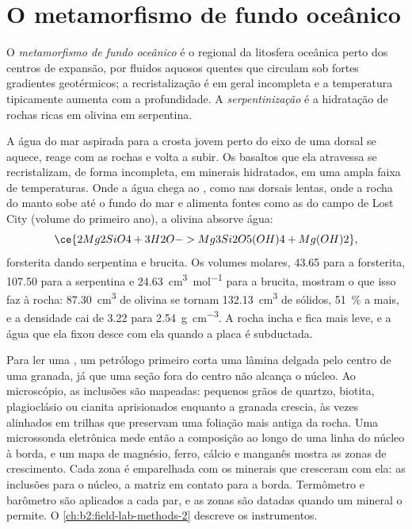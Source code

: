 \section{O metamorfismo de fundo oceânico}\label{sec:b2:pt-paths:ocean-floor}

\begin{definition}\label{def:b2:pt-paths:ocean-floor}
O \emph{metamorfismo de fundo oceânico} é o
 regional da litosfera oceânica perto dos centros de expansão, por fluidos aquosos quentes
que circulam sob fortes gradientes geotérmicos; a recristalização é em geral incompleta
e a temperatura tipicamente aumenta com a profundidade. A \emph{serpentinização}
é a hidratação de rochas ricas em olivina em serpentina.
\end{definition}

A água do mar aspirada para a crosta jovem perto do eixo de uma dorsal se aquece, reage com as rochas e
volta a subir. Os basaltos que ela atravessa se recristalizam, de forma incompleta, em minerais
hidratados, em uma ampla faixa de temperaturas. Onde a água chega ao , como nas
dorsais lentas, onde a rocha do manto sobe até o fundo do mar e alimenta fontes como
as do campo de Lost City (volume do primeiro ano), a olivina absorve água:
\[
\ce{2 Mg2SiO4 + 3 H2O -> Mg3Si2O5(OH)4 + Mg(OH)2},
\]
forsterita dando serpentina e brucita. Os volumes molares, 43.65 para a forsterita, 107.50
para a serpentina e \qty{24.63}{cm^3.mol^{-1}} para a brucita, mostram o que isso faz à rocha:
\qty{87.30}{cm^3} de olivina se tornam \qty{132.13}{cm^3} de sólidos, \qty{51}{\percent}
a mais, e a densidade cai de 3.22 para \qty{2.54}{g.cm^{-3}}. A rocha incha e
fica mais leve, e a água que ela fixou desce com ela quando a placa é subductada.

\begin{inthelab}
Para ler uma , um petrólogo primeiro corta uma lâmina delgada pelo centro de uma
granada, já que uma seção fora do centro não alcança o núcleo. Ao microscópio, as inclusões
são mapeadas: pequenos grãos de quartzo, biotita, plagioclásio ou cianita aprisionados enquanto a granada
crescia, às vezes alinhados em trilhas que preservam uma foliação mais antiga da rocha. Uma microssonda
eletrônica mede então a composição ao longo de uma linha do núcleo à borda, e um mapa de
magnésio, ferro, cálcio e manganês mostra as zonas de crescimento. Cada zona é emparelhada com
os minerais que cresceram com ela: as inclusões para o núcleo, a matriz em contato para a
borda. Termômetro e barômetro são aplicados a cada par, e as zonas são datadas quando um
mineral o permite. O \cref{ch:b2:field-lab-methods-2} descreve os instrumentos.
\end{inthelab}

